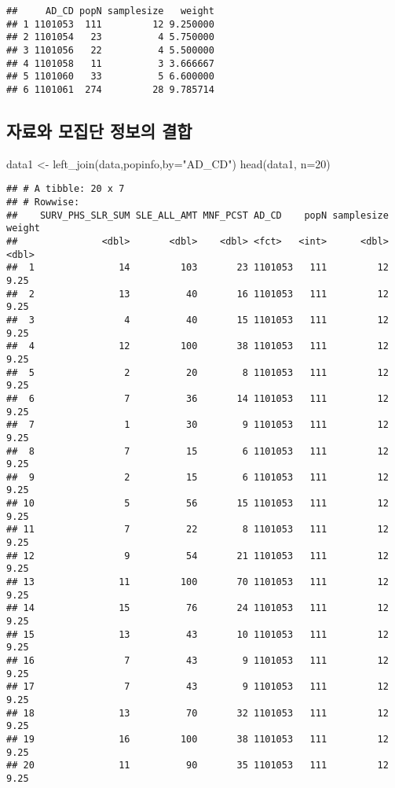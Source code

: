 \documentclass[
]{book}
\newenvironment{Shaded}{\begin{snugshade}}{\end{snugshade}}
\newcommand{\AttributeTok}[1]{\textcolor[rgb]{0.77,0.63,0.00}{#1}}
\newcommand{\DecValTok}[1]{\textcolor[rgb]{0.00,0.00,0.81}{#1}}
\newcommand{\FunctionTok}[1]{\textcolor[rgb]{0.00,0.00,0.00}{#1}}
\newcommand{\NormalTok}[1]{#1}
\newcommand{\OtherTok}[1]{\textcolor[rgb]{0.56,0.35,0.01}{#1}}
\newcommand{\StringTok}[1]{\textcolor[rgb]{0.31,0.60,0.02}{#1}}
\begin{document}
\begin{verbatim}
##     AD_CD popN samplesize   weight
## 1 1101053  111         12 9.250000
## 2 1101054   23          4 5.750000
## 3 1101056   22          4 5.500000
## 4 1101058   11          3 3.666667
## 5 1101060   33          5 6.600000
## 6 1101061  274         28 9.785714
\end{verbatim}

\hypertarget{uxc790uxb8ccuxc640-uxbaa8uxc9d1uxb2e8-uxc815uxbcf4uxc758-uxacb0uxd569}{%
\subsection{자료와 모집단 정보의 결합}\label{uxc790uxb8ccuxc640-uxbaa8uxc9d1uxb2e8-uxc815uxbcf4uxc758-uxacb0uxd569}}

\begin{Shaded}
\begin{Highlighting}[]
\NormalTok{data1 }\OtherTok{\textless{}{-}} \FunctionTok{left\_join}\NormalTok{(data,popinfo,}\AttributeTok{by=}\StringTok{"AD\_CD"}\NormalTok{)  }
\FunctionTok{head}\NormalTok{(data1, }\AttributeTok{n=}\DecValTok{20}\NormalTok{)}
\end{Highlighting}
\end{Shaded}

\begin{verbatim}
## # A tibble: 20 x 7
## # Rowwise: 
##    SURV_PHS_SLR_SUM SLE_ALL_AMT MNF_PCST AD_CD    popN samplesize weight
##               <dbl>       <dbl>    <dbl> <fct>   <int>      <dbl>  <dbl>
##  1               14         103       23 1101053   111         12   9.25
##  2               13          40       16 1101053   111         12   9.25
##  3                4          40       15 1101053   111         12   9.25
##  4               12         100       38 1101053   111         12   9.25
##  5                2          20        8 1101053   111         12   9.25
##  6                7          36       14 1101053   111         12   9.25
##  7                1          30        9 1101053   111         12   9.25
##  8                7          15        6 1101053   111         12   9.25
##  9                2          15        6 1101053   111         12   9.25
## 10                5          56       15 1101053   111         12   9.25
## 11                7          22        8 1101053   111         12   9.25
## 12                9          54       21 1101053   111         12   9.25
## 13               11         100       70 1101053   111         12   9.25
## 14               15          76       24 1101053   111         12   9.25
## 15               13          43       10 1101053   111         12   9.25
## 16                7          43        9 1101053   111         12   9.25
## 17                7          43        9 1101053   111         12   9.25
## 18               13          70       32 1101053   111         12   9.25
## 19               16         100       38 1101053   111         12   9.25
## 20               11          90       35 1101053   111         12   9.25
\end{verbatim}
\end{document}
